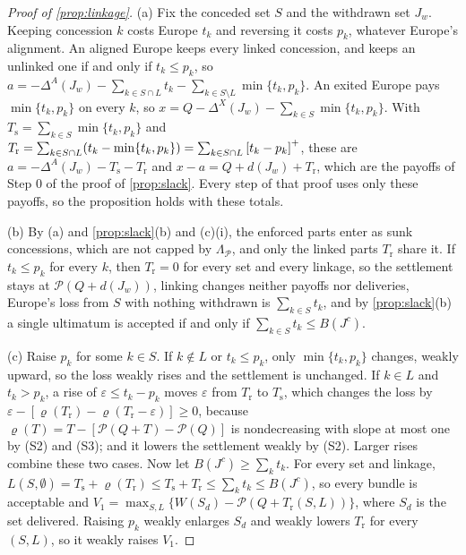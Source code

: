 \begin{proof}[Proof of \cref{prop:linkage}]
(a) Fix the conceded set $S$ and the withdrawn set $J_w$. Keeping concession $k$ costs Europe $t_k$ and reversing it costs $p_k$, whatever Europe's alignment. An aligned Europe keeps every linked concession, and keeps an unlinked one if and only if $t_k\le p_k$, so $a=-\Delta^A(J_w)-\sum_{k\in S\cap L}t_k-\sum_{k\in S\setminus L}\min\{t_k,p_k\}$. An exited Europe pays $\min\{t_k,p_k\}$ on every $k$, so $x=Q-\Delta^X(J_w)-\sum_{k\in S}\min\{t_k,p_k\}$. With $T_{\mathrm s}=\sum_{k\in S}\min\{t_k,p_k\}$ and $T_{\mathrm r}=\sum_{k\in S\cap L}(t_k-\min\{t_k,p_k\})=\sum_{k\in S\cap L}\left[t_k-p_k\right]^{+}$, these are $a=-\Delta^A(J_w)-T_{\mathrm s}-T_{\mathrm r}$ and $x-a=Q+d(J_w)+T_{\mathrm r}$, which are the payoffs of Step 0 of the proof of \cref{prop:slack}. Every step of that proof uses only these payoffs, so the proposition holds with these totals.

(b) By (a) and \cref{prop:slack}(b) and (c)(i), the enforced parts enter as sunk concessions, which are not capped by $\Lambda_{\mathcal P}$, and only the linked parts $T_{\mathrm r}$ share it. If $t_k\le p_k$ for every $k$, then $T_{\mathrm r}=0$ for every set and every linkage, so the settlement stays at $\mathcal P(Q+d(J_w))$, linking changes neither payoffs nor deliveries, Europe's loss from $S$ with nothing withdrawn is $\sum_{k\in S}t_k$, and by \cref{prop:slack}(b) a single ultimatum is accepted if and only if $\sum_{k\in S}t_k\le B(J^c)$.

(c) Raise $p_k$ for some $k\in S$. If $k\notin L$ or $t_k\le p_k$, only $\min\{t_k,p_k\}$ changes, weakly upward, so the loss weakly rises and the settlement is unchanged. If $k\in L$ and $t_k>p_k$, a rise of $\varepsilon\le t_k-p_k$ moves $\varepsilon$ from $T_{\mathrm r}$ to $T_{\mathrm s}$, which changes the loss by $\varepsilon-[\varrho(T_{\mathrm r})-\varrho(T_{\mathrm r}-\varepsilon)]\ge 0$, because $\varrho(T)=T-[\mathcal P(Q+T)-\mathcal P(Q)]$ is nondecreasing with slope at most one by (S2) and (S3); and it lowers the settlement weakly by (S2). Larger rises combine these two cases. Now let $B(J^c)\ge\sum_kt_k$. For every set and linkage, $L(S,\emptyset)=T_{\mathrm s}+\varrho(T_{\mathrm r})\le T_{\mathrm s}+T_{\mathrm r}\le\sum_kt_k\le B(J^c)$, so every bundle is acceptable and $V_1=\max_{S,L}\{W(S_d)-\mathcal P(Q+T_{\mathrm r}(S,L))\}$, where $S_d$ is the set delivered. Raising $p_k$ weakly enlarges $S_d$ and weakly lowers $T_{\mathrm r}$ for every $(S,L)$, so it weakly raises $V_1$.
\end{proof}

